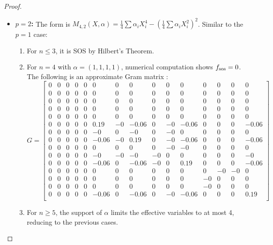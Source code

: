 \documentclass{article}
\begin{document}
\begin{proof}
\begin{itemize}
    \item \textbf{$p=2$:} The form is $M_{4,2}(X, \alpha) = \frac{1}{4}\sum \alpha_i X_i^4 - (\frac{1}{4}\sum \alpha_i X_i^2)^2$.
    Similar to the $p=1$ case:
    \begin{enumerate}
        \item For $n \leq 3$, it is SOS by Hilbert's Theorem.
        \item For $n=4$ with $\alpha=(1,1,1,1)$, numerical computation shows $f_{\rm sos}=0$. The following is an approximate Gram matrix \cite{GMIr}:
         {\scriptsize
         \setlength\arraycolsep{1.5pt}
         \[
            G = \begin{bmatrix}
            0 & 0 & 0 & 0 & 0 & 0 & 0 & 0 & 0 & 0 & 0 & 0 & 0 & 0 & 0 \\
            0 & 0 & 0 & 0 & 0 & 0 & 0 & 0 & 0 & 0 & 0 & 0 & 0 & 0 & 0 \\
            0 & 0 & 0 & 0 & 0 & 0 & 0 & 0 & 0 & 0 & 0 & 0 & 0 & 0 & 0 \\
            0 & 0 & 0 & 0 & 0 & 0 & 0 & 0 & 0 & 0 & 0 & 0 & 0 & 0 & 0 \\
            0 & 0 & 0 & 0 & 0 & 0 & 0 & 0 & 0 & 0 & 0 & 0 & 0 & 0 & 0 \\
            0 & 0 & 0 & 0 & 0 & 0.19 & -0 & -0.06 & 0 & -0 & -0.06 & 0 & 0 & 0 & -0.06 \\
            0 & 0 & 0 & 0 & 0 & -0 & 0 & -0 & 0 & -0 & 0 & 0 & 0 & 0 & 0 \\
            0 & 0 & 0 & 0 & 0 & -0.06 & -0 & 0.19 & 0 & -0 & -0.06 & 0 & 0 & 0 & -0.06 \\
            0 & 0 & 0 & 0 & 0 & 0 & 0 & 0 & 0 & -0 & -0 & 0 & 0 & 0 & 0 \\
            0 & 0 & 0 & 0 & 0 & -0 & -0 & -0 & -0 & 0 & 0 & 0 & 0 & 0 & -0 \\
            0 & 0 & 0 & 0 & 0 & -0.06 & 0 & -0.06 & -0 & 0 & 0.19 & 0 & 0 & 0 & -0.06 \\
            0 & 0 & 0 & 0 & 0 & 0 & 0 & 0 & 0 & 0 & 0 & 0 & -0 & -0 & 0 \\
            0 & 0 & 0 & 0 & 0 & 0 & 0 & 0 & 0 & 0 & 0 & -0 & 0 & 0 & 0 \\
            0 & 0 & 0 & 0 & 0 & 0 & 0 & 0 & 0 & 0 & 0 & -0 & 0 & 0 & 0 \\
            0 & 0 & 0 & 0 & 0 & -0.06 & 0 & -0.06 & 0 & -0 & -0.06 & 0 & 0 & 0 & 0.19 \\
            \end{bmatrix}
         \]
         }
        \item For $n \geq 5$, the support of $\alpha$ limits the effective variables to at most 4, reducing to the 
        previous cases.
    \end{enumerate}
\end{itemize}


\end{proof}
\end{document}
